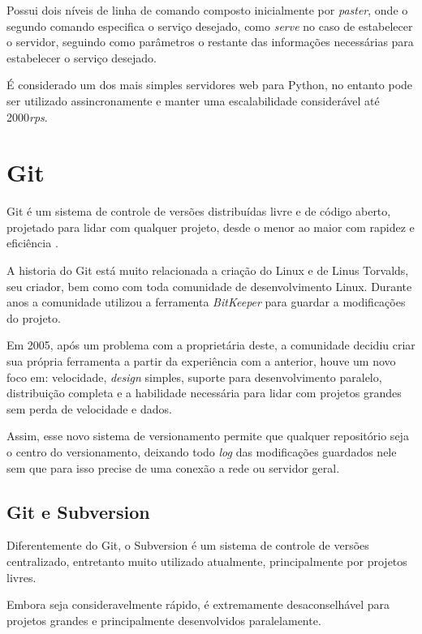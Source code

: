 Possui dois níveis de linha de comando composto inicialmente por \textit{paster}, onde o segundo comando especifica o serviço desejado, como \textit{serve} no caso de estabelecer o servidor, seguindo como parâmetros o restante das informações necessárias para estabelecer o serviço desejado.

É considerado um dos mais simples servidores web para Python, no entanto pode ser utilizado assincronamente e manter uma escalabilidade considerável até 2000\textit{rps}.


\section{Git}

Git é um sistema de controle de versões distribuídas livre e de código aberto, projetado para lidar com qualquer projeto, desde o menor ao maior com rapidez e eficiência \cite{SOFTWARE-FREEDOM-CONSERVANCY}.

A historia do Git está muito relacionada a criação do Linux e de Linus Torvalds, seu criador, bem como com toda comunidade de desenvolvimento Linux. Durante anos a comunidade utilizou a ferramenta \textit{BitKeeper} para guardar a modificações do projeto.

Em 2005, após um problema com a proprietária deste, a comunidade decidiu criar sua própria ferramenta a partir da experiência com a anterior, houve um novo foco em: velocidade, \textit{design} simples, suporte para desenvolvimento paralelo, distribuição completa e a habilidade necessária para lidar com projetos grandes sem perda de velocidade e dados.

Assim, esse novo sistema de versionamento permite que qualquer repositório seja o centro do versionamento, deixando todo \textit{log} das modificações guardados nele sem que para isso precise de uma conexão a rede ou servidor geral.


\subsection{Git e Subversion}

Diferentemente do Git, o Subversion é um sistema de controle de versões centralizado, entretanto muito utilizado atualmente, principalmente por projetos livres.

Embora seja consideravelmente rápido, é extremamente desaconselhável para projetos grandes e principalmente desenvolvidos paralelamente.
